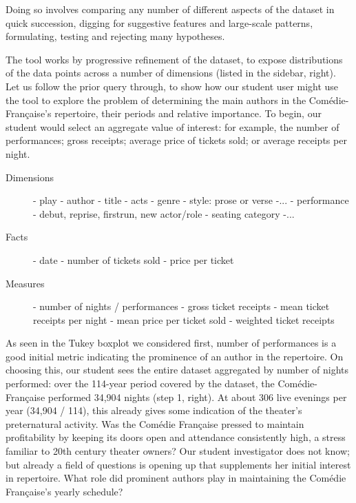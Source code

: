 \documentclass[	DIV=calc,%
							paper=a4,%
							fontsize=11pt,%
							twocolumn]{scrartcl}	 					%
\begin{document}
Doing so involves comparing any number of different aspects of the dataset in quick succession, digging for suggestive features and large-scale patterns, formulating, testing and rejecting many hypotheses.

The tool works by progressive refinement of the dataset, to expose distributions of the data points across a number of dimensions (listed in the sidebar, right).  Let us follow the prior query through, to show how our student user might use the tool to explore the problem of determining the main authors in the Comédie-Française’s repertoire, their periods and relative importance.  To begin, our student would select an aggregate value of interest: for example, the number of performances; gross receipts; average price of tickets sold; or average receipts per night.

\begin{tcolorbox}
	\begin{description}
		\item[Dimensions]
			- play
			- author
			- title
			- acts
			- genre
			- style: prose or verse -...
			- performance
			- debut, reprise, firstrun, new actor/role
			- seating category -...

		\item[Facts]
			- date
			- number of tickets sold
			- price per ticket

		\item[Measures]
			- number of nights / performances
			- gross ticket receipts
			- mean ticket receipts per night
			- mean price per ticket sold
			- weighted ticket receipts
  \end{description}
\end{tcolorbox}

As seen in the Tukey boxplot we considered first, number of performances is a good initial metric indicating the prominence of an author in the repertoire.  On choosing this, our student sees the entire dataset aggregated by number of nights performed: over the 114-year period covered by the dataset, the Comédie-Française performed 34,904 nights (step 1, right).  At about 306 live evenings per year (34,904 / 114), this already gives some indication of the theater’s preternatural activity.  Was the Comédie Française pressed to maintain profitability by keeping its doors open and attendance consistently high, a stress familiar to 20th century theater owners?  Our student investigator does not know; but already a field of questions is opening up that supplements her initial interest in repertoire.  What role did prominent authors play in maintaining the Comédie Française’s yearly schedule?
\end{document}
